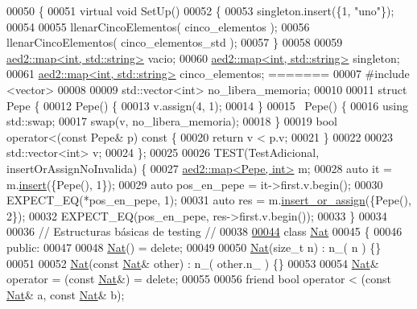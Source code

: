 \begin{DoxyCode}
00050 \{
00051     \textcolor{keyword}{virtual} \textcolor{keywordtype}{void} SetUp()
00052     \{
00053         singleton.insert(\{1, \textcolor{stringliteral}{"uno"}\});
00054 
00055         llenarCincoElementos( cinco\_elementos );
00056         llenarCincoElementos( cinco\_elementos\_std );
00057     \}
00058 
00059     \hyperlink{classaed2_1_1map}{aed2::map<int, std::string>} vacio;
00060     \hyperlink{classaed2_1_1map}{aed2::map<int, std::string>} singleton;
00061     \hyperlink{classaed2_1_1map}{aed2::map<int, std::string>} cinco\_elementos;
=======
00007 \textcolor{preprocessor}{#include <vector>}
00008 
00009 std::vector<int> no\_libera\_memoria;
00010 
00011 \textcolor{keyword}{struct }Pepe \{
00012     Pepe() \{
00013         v.assign(4, 1);
00014     \}
00015     ~Pepe() \{
00016         \textcolor{keyword}{using} std::swap;
00017         swap(v, no\_libera\_memoria);
00018     \}
00019     \textcolor{keywordtype}{bool} operator<(\textcolor{keyword}{const} Pepe& p)\textcolor{keyword}{ const }\{
00020         \textcolor{keywordflow}{return} v < p.v;
00021     \}
00022     
00023     std::vector<int> v;
00024 \};
00025 
00026 TEST(TestAdicional, insertOrAssignNoInvalida) \{
00027     \hyperlink{classaed2_1_1map}{aed2::map<Pepe, int>} m;
00028     \textcolor{keyword}{auto} it = m.\hyperlink{classaed2_1_1map_a60aacba06b1579630b3c8e996cf248c8_a60aacba06b1579630b3c8e996cf248c8}{insert}(\{Pepe(), 1\});
00029     \textcolor{keyword}{auto} pos\_en\_pepe = it->first.v.begin();
00030     EXPECT\_EQ(*pos\_en\_pepe, 1);
00031     \textcolor{keyword}{auto} res = m.\hyperlink{classaed2_1_1map_a2ef6723c183916276b0afc4a4c721475_a2ef6723c183916276b0afc4a4c721475}{insert\_or\_assign}(\{Pepe(), 2\});
00032     EXPECT\_EQ(pos\_en\_pepe, res->first.v.begin());
00033 \}
00034 
00036 \textcolor{comment}{// Estructuras básicas de testing //}
00038 \textcolor{comment}{}
\hyperlink{classNat}{00044} \textcolor{keyword}{class }\hyperlink{classNat}{Nat}
00045 \{
00046     \textcolor{keyword}{public}:
00047 
00048         \hyperlink{classNat}{Nat}() = \textcolor{keyword}{delete};
00049 
00050         \hyperlink{classNat}{Nat}(\textcolor{keywordtype}{size\_t} n) : n\_( n ) \{\}
00051 
00052         \hyperlink{classNat}{Nat}(\textcolor{keyword}{const} \hyperlink{classNat}{Nat}& other) : n\_( other.n\_ ) \{\}
00053 
00054         \hyperlink{classNat}{Nat}& operator = (\textcolor{keyword}{const} \hyperlink{classNat}{Nat}&) = \textcolor{keyword}{delete};
00055 
00056         \textcolor{keyword}{friend} \textcolor{keywordtype}{bool} operator < (\textcolor{keyword}{const} \hyperlink{classNat}{Nat}& a, \textcolor{keyword}{const} \hyperlink{classNat}{Nat}& b);

\end{DoxyCode}
